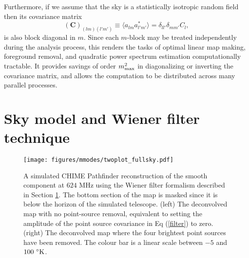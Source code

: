 Furthermore, if we assume that the sky is a statistically isotropic random field then its covariance matrix
\begin{equation}
(\mathbf{C})_{(lm)(l'm')} \equiv \langle a_{lm} a_{l'm'}^* \rangle = \delta_{ll'} \delta_{mm'} C_l,
\end{equation}
is also block diagonal in $m$. Since each $m$-block may be treated independently during the analysis process, this renders the tasks of optimal linear map making, foreground removal, and quadratic power spectrum estimation computationally tractable. It provides savings of order $m_{\rm max}^2$ in diagonalizing or inverting the covariance matrix, and allows the computation to be distributed across many parallel processes.

\section{Sky model and Wiener filter technique}
\label{ch:mm:sec:model}

\begin{figure*}
\centering
\texttt{[image: figures/mmodes/twoplot\_fullsky.pdf]}
\caption{A simulated CHIME Pathfinder reconstruction of the smooth component at $624$ MHz using the Wiener filter formalism described in Section \ref{ch:mm:sec:model}. The bottom section of the map is masked since it is below the horizon of the simulated telescope. (left) The deconvolved map with no point-source removal, equivalent to setting the amplitude of the point source covariance in Eq (\ref{filter}) to zero. (right) The deconvolved map where the four brightest point sources have been removed. The colour bar is a linear scale between $-5$ and $100~{\rm ^{\circ}K}$.}
\label{standard}
\end{figure*}

